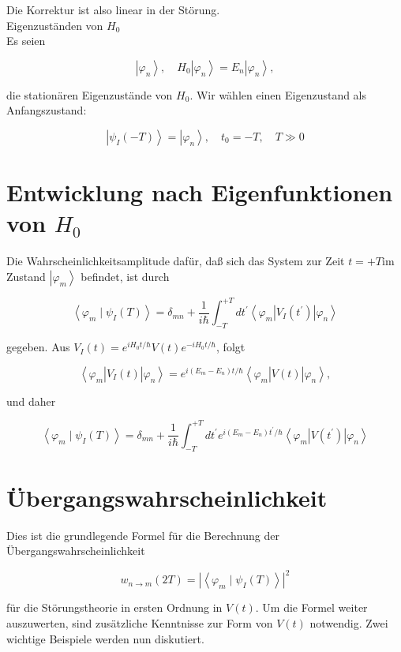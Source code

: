 \documentclass[10pt, letterpaper]{article}
\begin{document}
Die Korrektur ist also linear in der Störung.\\
Eigenzuständen von $H_{0}$\\
Es seien

$$
\left|\varphi_{n}\right\rangle, \quad H_{0}\left|\varphi_{n}\right\rangle=E_{n}\left|\varphi_{n}\right\rangle,
$$

die stationären Eigenzustände von $H_{0}$. Wir wählen einen Eigenzustand als Anfangszustand:

$$
\left|\psi_{I}(-T)\right\rangle=\left|\varphi_{n}\right\rangle, \quad t_{0}=-T, \quad T \gg 0
$$

\section*{Entwicklung nach Eigenfunktionen von $H_{0}$}
Die Wahrscheinlichkeitsamplitude dafür, daß sich das System zur Zeit $t=+T \mathrm{im}$ Zustand $\left|\varphi_{m}\right\rangle$ befindet, ist durch

$$
\left\langle\varphi_{m} \mid \psi_{I}(T)\right\rangle=\delta_{m n}+\frac{1}{i \hbar} \int_{-T}^{+T} d t^{\prime}\left\langle\varphi_{m}\right| V_{I}\left(t^{\prime}\right)\left|\varphi_{n}\right\rangle
$$

gegeben. Aus $V_{I}(t)=e^{i H_{0} t / \hbar} V(t) e^{-i H_{0} t / \hbar}$, folgt

$$
\left\langle\varphi_{m}\right| V_{I}(t)\left|\varphi_{n}\right\rangle=e^{i\left(E_{m}-E_{n}\right) t / \hbar}\left\langle\varphi_{m}\right| V(t)\left|\varphi_{n}\right\rangle,
$$

und daher

$$
\left\langle\varphi_{m} \mid \psi_{I}(T)\right\rangle=\delta_{m n}+\frac{1}{i \hbar} \int_{-T}^{+T} d t^{\prime} e^{i\left(E_{m}-E_{n}\right) t^{\prime} / \hbar}\left\langle\varphi_{m}\right| V\left(t^{\prime}\right)\left|\varphi_{n}\right\rangle
$$

\section*{Übergangswahrscheinlichkeit}
Dies ist die grundlegende Formel für die Berechnung der Übergangswahrscheinlichkeit

$$
w_{n \rightarrow m}(2 T)=\left|\left\langle\varphi_{m} \mid \psi_{I}(T)\right\rangle\right|^{2}
$$

für die Störungstheorie in ersten Ordnung in $V(t)$. Um die Formel weiter auszuwerten, sind zusätzliche Kenntnisse zur Form von $V(t)$ notwendig. Zwei wichtige Beispiele werden nun diskutiert.
\end{document}

